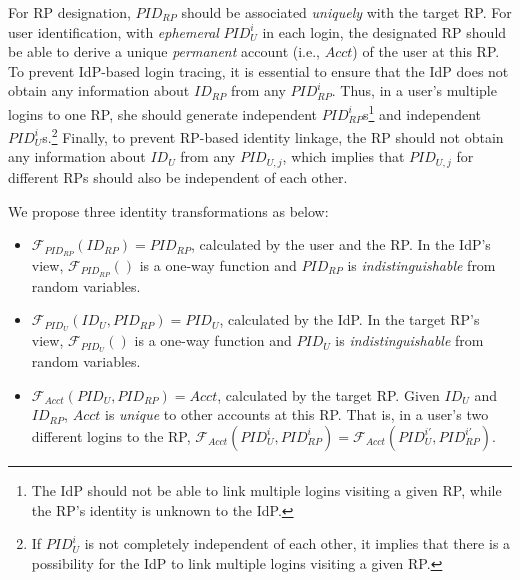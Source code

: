 For RP designation, $PID_{RP}$ should be associated \emph{uniquely} with the target RP.
For user identification, with \emph{ephemeral} $PID_{U}^i$ in each login, the designated RP should be able to derive a unique \emph{permanent} account  (i.e., $Acct$) of the user at this RP.
To prevent IdP-based login tracing, it is essential to ensure that the IdP does not obtain any information about $ID_{RP}$ from any $PID_{RP}^i$.
Thus, in a user's multiple logins to one RP,
 she should generate independent $PID_{RP}^i$s\footnote{The IdP should not be able to link multiple logins visiting a given RP, while the RP's identity is unknown to the IdP.} %
and independent $PID_U^i$s.\footnote{If $PID_U^i$ is not completely independent of each other, it implies that there is a possibility for the IdP to link multiple logins visiting a given RP.}
Finally, to prevent RP-based identity linkage,
the RP should not obtain any information about $ID_U$ from any $PID_{U,j}$, which implies that $PID_{U,j}$ for different RPs should also be independent of each other.

We propose three identity transformations as below:
\vspace{-\topsep}\begin{itemize}
\setlength{\topsep}{0pt}
\setlength{\partopsep}{0pt}
\setlength{\itemsep}{0pt}
\setlength{\parsep}{0pt}
\setlength{\parskip}{0pt}
\item
$\mathcal{F}_{PID_{RP}}(ID_{RP}) = PID_{RP}$, calculated by the user and the RP.
In the IdP's view,
$\mathcal{F}_{PID_{RP}}()$ is a one-way function and $PID_{RP}$
is \emph{indistinguishable} from random variables.
\item
$\mathcal{F}_{PID_U}(ID_U, PID_{RP}) = PID_{U}$, calculated by the IdP.
In the target RP's view,
    $\mathcal{F}_{PID_U}()$ is a one-way function and $PID_{U}$ is \emph{indistinguishable} from random variables.
\item
$\mathcal{F}_{Acct}(PID_{U}, PID_{RP}) = Acct$, calculated by the target RP.
Given $ID_U$ and $ID_{RP}$, $Acct$ is %
\emph{unique} to other accounts at this RP.
That is, in a user's two different logins to the RP,
 $\mathcal{F}_{Acct}(PID_{U}^i, PID_{RP}^i) = \mathcal{F}_{Acct}(PID_{U}^{i'}, PID_{RP}^{i'})$.
\end{itemize}




